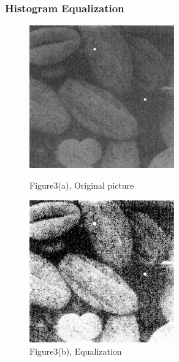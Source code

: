 \documentclass[notheorems, serif, table, compress]{beamer}  %
\begin{document}
\begin{frame}
\frametitle{Histogram Equalization}%
 \begin{figure}
        \begin{minipage}[t]{0.4\linewidth}
        \centering
        \includegraphics[width=0.6\linewidth]{huafen.png} 
        \caption{Figure3(a), Original picture}
        \end{minipage}
        \begin{minipage}[t]{0.4\linewidth}
        \centering
        \includegraphics[width=0.6\linewidth]{huafeneq.png} 
          \caption{Figure3(b), Equalization}
        \end{minipage}
    \end{figure}


\end{frame}
\end{document}

